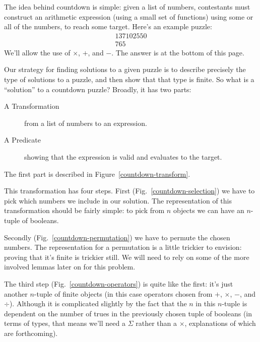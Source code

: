 The idea behind countdown is simple: given a list of numbers, contestants must
construct an arithmetic expression (using a small set of functions) using some
or all of the numbers, to reach some target.
Here's an example puzzle:
\begin{gather*}
  \boxed{1} \boxed{3} \boxed{7} \boxed{10} \boxed{25} \boxed{50} \\
  \boxed{765} \tag{Target}
\end{gather*}
We'll allow the use of \(\times\), \(+\), and \(-\).
The answer is at the bottom of this page\footnotemark.


Our strategy for finding solutions to a given puzzle is to describe precisely
the type of solutions to a puzzle, and then show that that type is finite.
So what is a ``solution'' to a countdown puzzle?
Broadly, it has two parts:
\begin{description}
  \item[A Transformation] from a list of numbers to an expression.
  \item[A Predicate] showing that the expression is valid and evaluates to the
    target.
\end{description}
The first part is described in Figure~\ref{countdown-transform}.



This transformation has four steps.
First (Fig.~\ref{countdown-selection}) we have to pick which numbers we include
in our solution.
The representation of this transformation should be fairly simple: to pick from
\(n\) objects we can have an \(n\)-tuple of booleans.

Secondly (Fig.~\ref{countdown-permutation}) we have to permute the chosen
numbers.
The representation for a permutation is a little trickier to envision: proving
that it's finite is trickier still.
We will need to rely on some of the more involved lemmas later on for this
problem.

The third step (Fig.~\ref{countdown-operators}) is quite like the first: it's
just another \(n\)-tuple of finite objects (in this case operators chosen from
\(+\), \(\times\), \(-\), and \(\div\)).
Although it is complicated slightly by the fact that the \(n\) in this
\(n\)-tuple is dependent on the number of trues in the previously chosen tuple
of booleans (in terms of types, that means we'll need a \(\Sigma\) rather than a
\(\times\), explanations of which are forthcoming).

